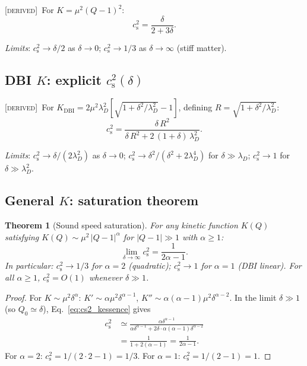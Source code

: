 \documentclass[prd,twocolumn,superscriptaddress,longbibliography,floatfix]{revtex4-2}
\newtheorem{theorem}{Theorem}
\newcommand{\cs}{c_{\mathrm{s}}}
\newcommand{\derived}{\textsc{[derived]}}
\begin{document}
\derived\ For $K = \mu^2(Q{-}1)^2$:
\begin{equation}
\cs^2 = \frac{\delta}{2 + 3\delta}.
\label{eq:cs2_delta}
\end{equation}

\emph{Limits}: $\cs^2 \to \delta/2$ as $\delta \to 0$;
$\cs^2 \to 1/3$ as $\delta \to \infty$ (stiff matter).

\subsection{DBI $K$: explicit $\cs^2(\delta)$}
\label{sec:cs2_DBI}

\derived\ For
$K_{\mathrm{DBI}} = 2\mu^2\lambda_D^2[\sqrt{1+\delta^2/\lambda_D^2}-1]$,
defining $R = \sqrt{1+\delta^2/\lambda_D^2}$:
\begin{equation}
\cs^2 = \frac{\delta\,R^2}
{\delta\,R^2 + 2\,(1{+}\delta)\,\lambda_D^2}.
\label{eq:cs2_DBI}
\end{equation}

\emph{Limits}: $\cs^2 \to \delta/(2\lambda_D^2)$ as
$\delta \to 0$; $\cs^2 \to \delta^2/(\delta^2+2\lambda_D^4)$
for $\delta \gg \lambda_D$; $\cs^2 \to 1$ for
$\delta \gg \lambda_D^2$.

\subsection{General $K$: saturation theorem}
\label{sec:saturation}

\begin{theorem}[Sound speed saturation]
\label{thm:saturation}
For any kinetic function $K(Q)$ satisfying
$K(Q) \sim \mu^2\,|Q{-}1|^\alpha$ for $|Q{-}1| \gg 1$
with $\alpha \geq 1$:
\begin{equation}
\lim_{\delta \to \infty} \cs^2 = \frac{1}{2\alpha - 1}.
\label{eq:saturation}
\end{equation}
In particular: $\cs^2 \to 1/3$ for $\alpha = 2$
(quadratic); $\cs^2 \to 1$ for $\alpha = 1$
(DBI linear).  For all $\alpha \geq 1$,
$\cs^2 = O(1)$ whenever $\delta \gg 1$.
\end{theorem}

\begin{proof}
For $K \sim \mu^2\delta^\alpha$:
$K' \sim \alpha\mu^2\delta^{\alpha-1}$,
$K'' \sim \alpha(\alpha{-}1)\mu^2\delta^{\alpha-2}$.
In the limit $\delta \gg 1$ (so $Q_0 \simeq \delta$),
Eq.~\eqref{eq:cs2_kessence} gives
\begin{align}
\cs^2 &\simeq \frac{\alpha\delta^{\alpha-1}}
{\alpha\delta^{\alpha-1}
  + 2\delta \cdot \alpha(\alpha{-}1)\delta^{\alpha-2}}
\nonumber\\
&= \frac{1}{1 + 2(\alpha{-}1)}
= \frac{1}{2\alpha{-}1}.
\end{align}
For $\alpha = 2$:
$\cs^2 = 1/(2 \cdot 2 - 1) = 1/3$.
For $\alpha = 1$: $\cs^2 = 1/(2 - 1) = 1$.
\end{proof}
\end{document}
